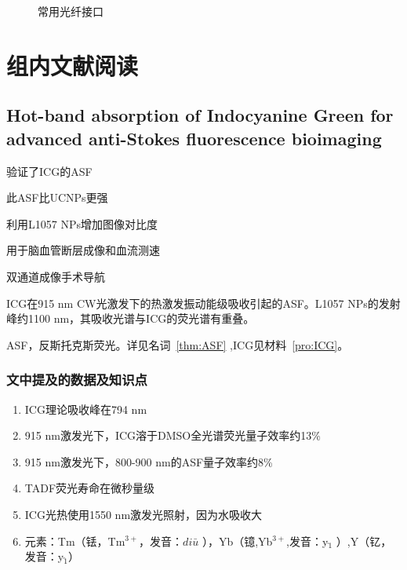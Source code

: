 \documentclass[cn,11pt,chinese]{elegantbook}
\begin{document}
\begin{figure}[h]
	\centering
	 \quad
	  \quad
	\caption{常用光纤接口} 
	\label{fig:fiber}
\end{figure}

\chapter{组内文献阅读}
\section{Hot-band absorption of Indocyanine Green for advanced anti-Stokes fluorescence bioimaging}

\begin{introduction}[创新点概要]
  \item 验证了ICG的ASF
  \item 此ASF比UCNPs更强
  \item 利用L1057 NPs增加图像对比度
  \item 用于脑血管断层成像和血流测速
  \item 双通道成像手术导航
\end{introduction}

\begin{remark}
  ICG在915 nm CW光激发下的热激发振动能级吸收引起的ASF。L1057 NPs的发射峰约1100 nm，其吸收光谱与ICG的荧光谱有重叠。
\end{remark}

\begin{note}
  ASF，反斯托克斯荧光。详见名词~\vref{thm:ASF} ,ICG见材料~\vref{pro:ICG}。
\end{note}

\subsection{文中提及的数据及知识点}

  \begin{enumerate}
    \item ICG理论吸收峰在794 nm
    \item 915 nm激发光下，ICG溶于DMSO全光谱荧光量子效率约13\%
    \item 915 nm激发光下，800-900 nm的ASF量子效率约8\%
    \item TADF荧光寿命在微秒量级
    \item ICG光热使用1550 nm激发光照射，因为水吸收大
    \item 元素：Tm（铥，Tm$^{3+}$，发音：$di\bar{u}$ ），Yb（镱,Yb$^{3+}$,发音：y$\grave{_1}$ ）,Y（钇，发音：y$\check{_1}$）
  \end{enumerate}
  
\end{document}
